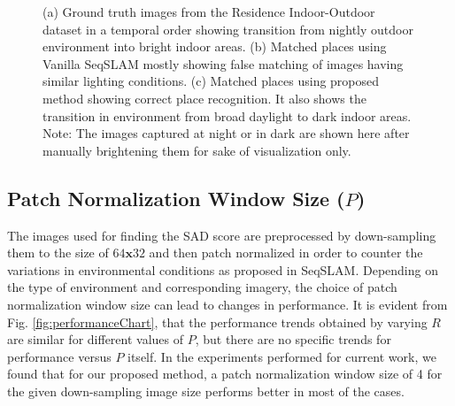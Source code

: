 \documentclass[letterpaper, 10 pt, conference]{ieeeconf}  %
\begin{document}
\begin{figure}[htbp]
\begin{tabular}{ccc}
 
\end{tabular}
\caption{(a) Ground truth images from the Residence Indoor-Outdoor dataset in a temporal order showing transition from nightly outdoor environment into bright indoor areas. (b) Matched places using Vanilla SeqSLAM mostly showing false matching of images having similar lighting conditions. (c) Matched places using proposed method showing correct place recognition. It also shows the transition in environment from broad daylight to dark indoor areas. Note: The images captured at night or in dark are shown here after manually brightening them for sake of visualization only.}
\label{fig:rioTransImages}
\end{figure}


\subsection{Patch Normalization Window Size ($P$)}
The images used for finding the SAD score are preprocessed by down-sampling them to the size of $64\mathbf{x}32$ and then patch normalized in order to counter the variations in environmental conditions as proposed in SeqSLAM. Depending on the type of environment and corresponding imagery, the choice of patch normalization window size can lead to changes in performance. It is evident from Fig. \ref{fig:performanceChart}, that the performance trends obtained by varying $R$ are similar for different values of $P$, but there are no specific trends for performance versus $P$ itself. In the experiments performed for current work, we found that for our proposed method, a patch normalization window size of 4 for the given down-sampling image size performs better in most of the cases.
\end{document}
